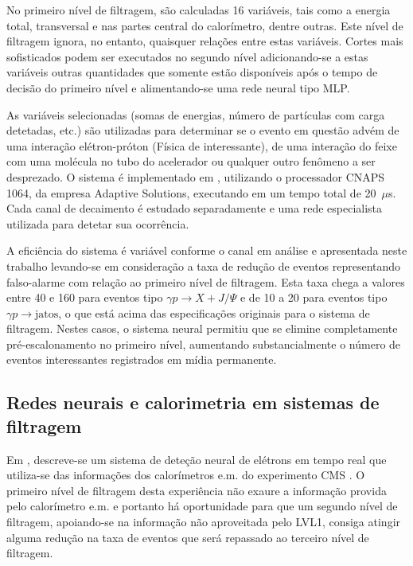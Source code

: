 No primeiro nível de filtragem, são calculadas 16 variáveis, tais como a
energia total, transversal e nas partes central do calorímetro, dentre
outras. Este nível de filtragem ignora, no entanto, quaisquer relações entre
estas variáveis. Cortes mais sofisticados podem ser executados no segundo
nível adicionando-se a estas variáveis outras quantidades que somente estão
disponíveis após o tempo de decisão do primeiro nível e alimentando-se uma
rede neural tipo MLP.

As variáveis selecionadas (somas de energias, número de partículas com carga
detetadas, etc.) são utilizadas para determinar se o evento em questão advém
de uma interação elétron-próton (Física de interessante), de uma interação do
feixe com uma molécula no tubo do acelerador ou qualquer outro fenômeno a ser
desprezado. O sistema é implementado em , utilizando o
processador CNAPS 1064, da empresa Adaptive Solutions, executando em um tempo
total de 20~$\mu$s. Cada canal de decaimento é estudado separadamente e uma
rede especialista utilizada para detetar sua ocorrência.

A eficiência do sistema é variável conforme o canal em análise e apresentada
neste trabalho levando-se em consideração a taxa de redução de eventos
representando falso-alarme com relação ao primeiro nível de filtragem. Esta
taxa chega a valores entre 40 e 160 para eventos tipo $\gamma p \rightarrow X
+ J/\Psi$ e de 10 a 20 para eventos tipo $\gamma p \rightarrow \text{jatos}$,
o que está acima das especificações originais para o sistema de
filtragem. Nestes casos, o sistema neural permitiu que se elimine
completamente pré-escalonamento no primeiro nível, aumentando
substancialmente o número de eventos interessantes registrados em mídia
permanente.

\subsection{Redes neurais e calorimetria em sistemas de filtragem}

Em \cite{varela-cms-1998}, descreve-se um sistema de deteção neural de
elétrons em tempo real que utiliza-se das informações dos calorímetros e.m. do
experimento CMS \cite{cms-trigger}. O primeiro nível de filtragem desta
experiência não exaure a informação provida pelo calorímetro e.m. e portanto
há oportunidade para que um segundo nível de filtragem, apoiando-se na
informação não aproveitada pelo LVL1, consiga atingir alguma redução na taxa
de eventos que será repassado ao terceiro nível de filtragem.

